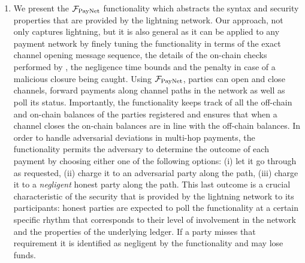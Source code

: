 \begin{enumerate}
\item We present the $\mathcal{F}_{\mathrm{PayNet}}{}$ functionality which abstracts the syntax and
security properties that are provided by the lightning network. Our 
approach, not only captures lightning, but it is also 
general as it  can be applied to any payment network 
by finely tuning the functionality in terms of the exact
channel opening message sequence, the details of the on-chain checks performed
by \fpaynet, the negligence time bounds and the penalty in case of a malicious
closure being caught. Using $\mathcal{F}_{\mathrm{PayNet}}{}$, parties can open and close channels,
forward payments along channel paths in the network as well as poll its status.
Importantly, the functionality keeps track of all the off-chain and on-chain
balances of the parties registered and ensures that when a channel closes the
on-chain balances are in line with the off-chain balances. In order to handle
adversarial deviations in multi-hop payments, the functionality permits the
adversary to determine the outcome of each payment by choosing either one of the
following options: (i) let it go through as requested, (ii) charge it to an
adversarial party along the path, (iii) charge it to a {\em negligent} honest
party along the path. This last outcome is a crucial characteristic of the
security that is provided by the lightning network to its participants: honest
parties are expected to poll the functionality at a certain specific rhythm that
corresponds to their level of involvement in the network and the properties of
the underlying ledger. If a party misses that requirement it is identified as
negligent by the functionality and may lose funds.


\end{enumerate}
